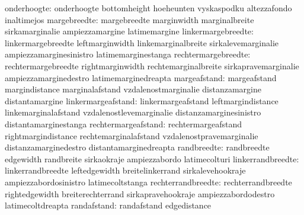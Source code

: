                      onderhoogte: onderhoogte                      bottomheight
                                  hoeheunten                       vyskaspodku
                                  altezzafondo                     inaltimejos
                    margebreedte: margebreedte                     marginwidth
                                  marginalbreite                   sirkamarginalie
                                  ampiezzamargine                  latimemargine %
              linkermargebreedte: linkermargebreedte               leftmarginwidth
                                  linkemarginalbreite              sirkalevemarginalie
                                  ampiezzamarginesinistro          latimemarginestanga
             rechtermargebreedte: rechtermargebreedte              rightmarginwidth
                                  rechtemarginalbreite             sirkapravemarginalie
                                  ampiezzamarginedestro            latimemarginedreapta
                    margeafstand: margeafstand                     margindistance
                                  marginalafstand                  vzdalenostmarginalie
                                  distanzamargine                  distantamargine
              linkermargeafstand: linkermargeafstand               leftmargindistance
                                  linkemarginalafstand             vzdalenostlevemarginalie
                                  distanzamarginesinistro          distantamarginestanga
             rechtermargeafstand: rechtermargeafstand              rightmargindistance
                                  rechtemarginalafstand            vzdalenostpravemarginalie
                                  distanzamarginedestro            distantamarginedreapta
                     randbreedte: randbreedte                      edgewidth
                                  randbreite                       sirkaokraje
                                  ampiezzabordo                    latimecolturi
               linkerrandbreedte: linkerrandbreedte                leftedgewidth
                                  breitelinkerrand                 sirkalevehookraje
                                  ampiezzabordosinistro            latimecoltstanga
              rechterrandbreedte: rechterrandbreedte               rightedgewidth
                                  breiterechterrand                sirkapravehookraje
                                  ampiezzabordodestro              latimecoltdreapta
                     randafstand: randafstand                      edgedistance
